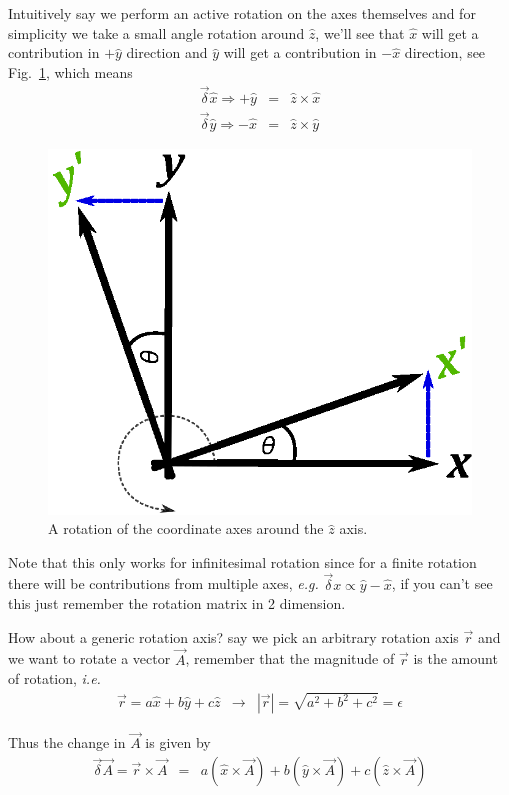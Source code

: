 \documentclass[aps,preprint,preprintnumbers,nofootinbib,showpacs,prd]{revtex4-1}
\newcommand{\ie}{{\it i.e.} }
\newcommand{\eg}{{\it e.g.} }
\newcommand{\nbea}{\begin{eqnarray*}}
\newcommand{\neea}{\end{eqnarray*}}
\begin{document}
Intuitively say we perform an active rotation on the axes themselves and for simplicity we take a small angle rotation around $\hat z$, we'll see that $\hat x$ will get a contribution in $+\hat y$ direction and $\hat y$ will get a contribution in $-\hat x$ direction, see Fig.~\ref{fig:inf-rot}, which means
\nbea
\vec \delta \hat x \Rightarrow +\hat y & = & \hat z \times \hat x \\
\vec \delta \hat y \Rightarrow -\hat x & = & \hat z \times \hat y
\neea
%
\begin{figure}
\begin{center}
  \includegraphics[scale=0.8]{inf-rot.eps}
\end{center}
  \caption{\label{fig:inf-rot}
A rotation of the coordinate axes around the $\hat z$ axis.}
\end{figure}
%

Note that this only works for infinitesimal rotation since for a finite rotation there will be contributions from multiple axes, \eg $\vec \delta x \propto \hat y - \hat x$, if you can't see this just remember the rotation matrix in 2 dimension.

How about a generic rotation axis? say we pick an arbitrary rotation axis $\vec r$ and we want to rotate a vector $\vec A$, remember that the magnitude of $\vec r$ is the amount of rotation, \ie
\nbea
\vec r = a \hat x + b \hat y + c \hat z &\longrightarrow& |\vec r| = \sqrt{a^2 + b^2 + c^2} = \epsilon
\neea

Thus the change in $\vec A$ is given by
\nbea
\vec \delta \vec A = \vec r \times \vec A & = & a (\hat x \times \vec A) + b (\hat y \times \vec A) + c (\hat z \times \vec A)
\neea
\end{document}
